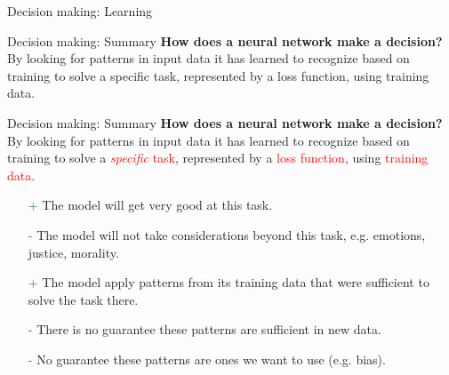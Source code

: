\documentclass[8pt]{beamer}
\begin{document}
\begin{frame}{Decision making: Learning}
	\end{frame}

	\begin{frame}[t]{Decision making: Summary}
		\vspace{2cm}
		\textbf{How does a neural network make a decision?}\\
		By looking for patterns in input data it has learned to recognize based on training to solve a specific task, represented by a loss function, using training data.
	\end{frame}

	\begin{frame}[t]{Decision making: Summary}
		\vspace{2cm}
		\textbf{How does a neural network make a decision?}\\
		By looking for patterns in input data it has learned to recognize based on training to solve a \textcolor{red}{\textit{specific} task}, represented by a \textcolor{red}{loss function}, using \textcolor{red}{training data}.
		\begin{itemize}
			\item[\textcolor{green}+] The model will get very good at this task.
			\item[\textcolor{red}-] The model will not take considerations beyond this task, e.g. emotions, justice, morality.
			\item[\textcolor{green}+] The model apply patterns from its training data that were sufficient to solve the task there.
			\item[\textcolor{red}-] There is no guarantee these patterns are sufficient in new data.
			\item[\textcolor{red}-] No guarantee these patterns are ones we want to use (e.g. bias).
		\end{itemize}
	\end{frame}
\end{document}
